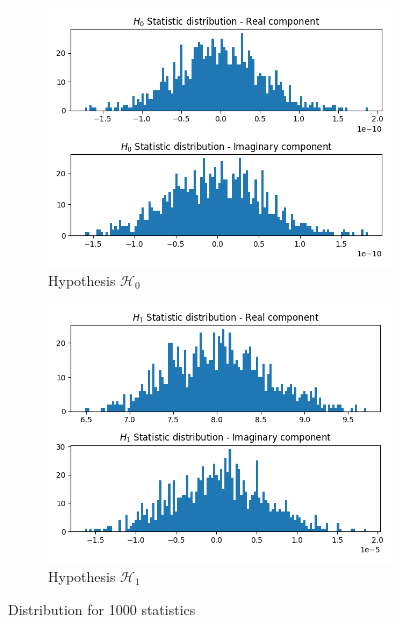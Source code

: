 \documentclass[a4 paper]{article}
\begin{document}
\begin{figure}[h]
	\centering
	\begin{subfigure}{.5\textwidth}
		\includegraphics[width=1\linewidth]{../results/cyclostationary_detector_a_H0.png}
		\caption{Hypothesis $\mathcal{H}_{0}$}
		\label{fig:cyclo_a1}
	\end{subfigure}%
	\begin{subfigure}{.5\textwidth}
		\includegraphics[width=1\linewidth]{../results/cyclostationary_detector_a_H1.png}
		\caption{Hypothesis $\mathcal{H}_{1}$}
		\label{fig:cyclo_a2}
	\end{subfigure}
	\caption{Distribution for 1000 statistics}
	\label{fig:cyclo_a}
\end{figure}
\end{document}

